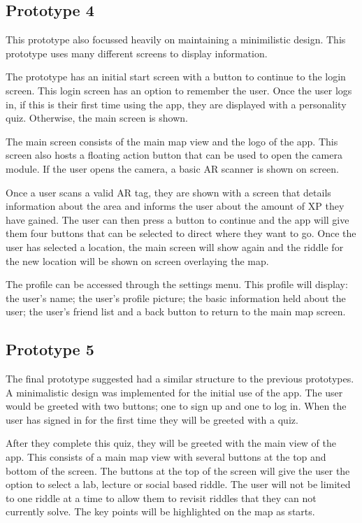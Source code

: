 \documentclass[10pt,twocolumn]{article} %
\begin{document}
\subsection*{Prototype 4}
This prototype also focussed heavily on maintaining a minimilistic design. This prototype uses many different screens to display information. 

The prototype has an initial start screen with a button to continue to the login screen. This login screen has an option to remember the user. Once the user logs in, if this is their first time using the app, they are displayed with a personality quiz. Otherwise, the main screen is shown.

The main screen consists of the main map view and the logo of the app. This screen also hosts a floating action button that can be used to open the camera module. If the user opens the camera, a basic AR scanner is shown on screen. 

Once a user scans a valid AR tag, they are shown with a screen that details information about the area and informs the user about the amount of XP they have gained. The user can then press a button to continue and the app will give them four buttons that can be selected to direct where they want to go. Once the user has selected a location, the main screen will show again and the riddle for the new location will be shown on screen overlaying the map.

The profile can be accessed through the settings menu. This profile will display: the user's name; the user's profile picture; the basic information held about the user; the user's friend list and a back button to return to the main map screen.

\subsection*{Prototype 5}

The final prototype suggested had a similar structure to the previous prototypes. A minimalistic design was implemented for the initial use of the app. The user would be greeted with two buttons; one to sign up and one to log in. When the user has signed in for the first time they will be greeted with a quiz.

After they complete this quiz, they will be greeted with the main view of the app. This consists of a main map view with several buttons at the top and bottom of the screen. The buttons at the top of the screen will give the user the option to select a lab, lecture or social based riddle. The user will not be limited to one riddle at a time to allow them to revisit riddles that they can not currently solve. The key points will be highlighted on the map as starts.
\end{document}
